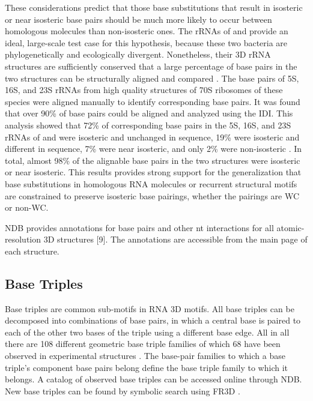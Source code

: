 These considerations predict that those base substitutions that result in
isosteric or near isosteric base pairs should be much more likely to occur
between homologous molecules than non-isosteric ones. The rRNAs of \EC{} and
\TT{} provide an ideal, large-scale test case for this hypothesis, because these
two bacteria are phylogenetically and ecologically divergent. Nonetheless, their
3D rRNA structures are sufficiently conserved that a large percentage of base
pairs in the two structures can be structurally aligned and compared
\cite{Stombaugh2009}. The base pairs of 5S, 16S, and 23S rRNAs from high quality
structures of 70S ribosomes of these species were aligned manually to identify
corresponding base pairs. It was found that over 90\% of base pairs could be
aligned and analyzed using the IDI. This analysis showed that 72\% of
corresponding base pairs in the 5S, 16S, and 23S rRNAs of \EC{} and \TT{} were
isosteric and unchanged in sequence, 19\% were isosteric and different in
sequence, 7\% were near isosteric, and only 2\% were non-isosteric
\cite{Stombaugh2009}. In total, almost 98\% of the alignable base pairs in the
two structures were isosteric or near isosteric. This results provides strong
support for the generalization that base substitutions in homologous RNA
molecules or recurrent structural motifs are constrained to preserve isosteric
base pairings, whether the pairings are WC or non-WC.

NDB provides annotations for base pairs and other nt interactions for all
atomic-resolution 3D structures [9]. The annotations are accessible from the
main page of each structure. 

\subsection{Base Triples}

Base triples are common sub-motifs in RNA 3D motifs. All base triples can be
decomposed into combinations of base pairs, in which a central base is paired to
each of the other two bases of the triple using a different base edge. All in
all there are 108 different geometric base triple families of which 68 have been
observed in experimental structures \cite{AbuAlmakarem2012b}. The base-pair
families to which a base triple's component base pairs belong define the base
triple family to which it belongs. A catalog of observed base triples can be
accessed online through NDB. New base triples can be found by symbolic search
using FR3D \cite{Petrov2011a}. 

